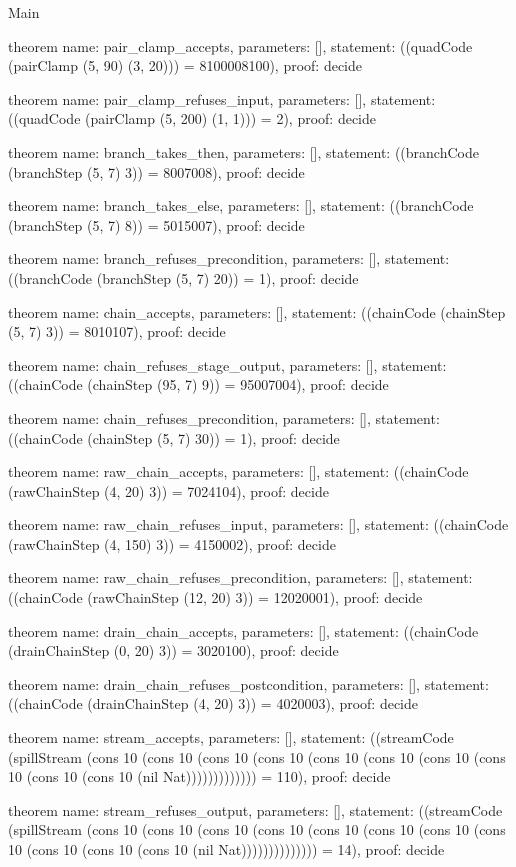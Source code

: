 \begin{lexlean}{Main}
\begin{semanticmodule}
theorem{
  name: pair_clamp_accepts,
  parameters: [],
  statement: ((quadCode (pairClamp (5, 90) (3, 20))) = 8100008100),
  proof: decide{}
}

theorem{
  name: pair_clamp_refuses_input,
  parameters: [],
  statement: ((quadCode (pairClamp (5, 200) (1, 1))) = 2),
  proof: decide{}
}

theorem{
  name: branch_takes_then,
  parameters: [],
  statement: ((branchCode (branchStep (5, 7) 3)) = 8007008),
  proof: decide{}
}

theorem{
  name: branch_takes_else,
  parameters: [],
  statement: ((branchCode (branchStep (5, 7) 8)) = 5015007),
  proof: decide{}
}

theorem{
  name: branch_refuses_precondition,
  parameters: [],
  statement: ((branchCode (branchStep (5, 7) 20)) = 1),
  proof: decide{}
}

theorem{
  name: chain_accepts,
  parameters: [],
  statement: ((chainCode (chainStep (5, 7) 3)) = 8010107),
  proof: decide{}
}

theorem{
  name: chain_refuses_stage_output,
  parameters: [],
  statement: ((chainCode (chainStep (95, 7) 9)) = 95007004),
  proof: decide{}
}

theorem{
  name: chain_refuses_precondition,
  parameters: [],
  statement: ((chainCode (chainStep (5, 7) 30)) = 1),
  proof: decide{}
}

theorem{
  name: raw_chain_accepts,
  parameters: [],
  statement: ((chainCode (rawChainStep (4, 20) 3)) = 7024104),
  proof: decide{}
}

theorem{
  name: raw_chain_refuses_input,
  parameters: [],
  statement: ((chainCode (rawChainStep (4, 150) 3)) = 4150002),
  proof: decide{}
}

theorem{
  name: raw_chain_refuses_precondition,
  parameters: [],
  statement: ((chainCode (rawChainStep (12, 20) 3)) = 12020001),
  proof: decide{}
}

theorem{
  name: drain_chain_accepts,
  parameters: [],
  statement: ((chainCode (drainChainStep (0, 20) 3)) = 3020100),
  proof: decide{}
}

theorem{
  name: drain_chain_refuses_postcondition,
  parameters: [],
  statement: ((chainCode (drainChainStep (4, 20) 3)) = 4020003),
  proof: decide{}
}

theorem{
  name: stream_accepts,
  parameters: [],
  statement: ((streamCode (spillStream (cons 10 (cons 10 (cons 10 (cons 10 (cons 10 (cons 10 (cons 10 (cons 10 (cons 10 (cons 10 (nil Nat))))))))))))) = 110),
  proof: decide{}
}

theorem{
  name: stream_refuses_output,
  parameters: [],
  statement: ((streamCode (spillStream (cons 10 (cons 10 (cons 10 (cons 10 (cons 10 (cons 10 (cons 10 (cons 10 (cons 10 (cons 10 (cons 10 (nil Nat)))))))))))))) = 14),
  proof: decide{}
}
\end{semanticmodule}
\end{lexlean}

